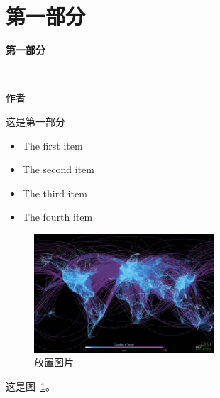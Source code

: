 \section*{第一部分}

\begin{frame}
	\centerline{\textbf{\Large{第一部分}}} 
	~\\
	\centerline{\large{作者}}
\end{frame}


\begin{frame}
	这是第一部分
	
	\begin{itemize}
		\item The first item
		\item The second item
		\item The third item
		\item The fourth item
	\end{itemize}

\end{frame}

\begin{frame}

	\begin{figure}[htbp]
		\centering
		\includegraphics[width=0.6\textwidth, bb=0 0 600 393]{pic/airtraffic.bmp}
		\caption{放置图片}
		\label{0-001}
	
	\end{figure}
	这是图~\ref{0-001}。

\end{frame}


